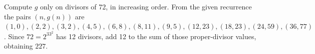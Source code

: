 Compute $g$ only on divisors of 72, in increasing order. From the given recurrence the pairs $(n,g(n))$ are $(1,0),(2,2),(3,2),(4,5),(6,8),(8,11),(9,5),(12,23),(18,23),(24,59),(36,77)$. Since $72=2^33^2$ has 12 divisors, add 12 to the sum of those proper-divisor values, obtaining $\boxed{227}$.
